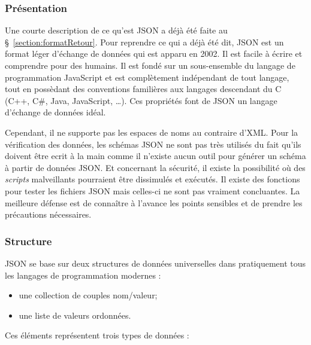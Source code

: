 \subsubsection{Pr\'esentation}

Une courte description de ce qu'est JSON a d\'ej\`a \'et\'e faite au \S~\ref{section:formatRetour}.
Pour reprendre ce qui a d\'ej\`a \'et\'e dit, JSON est un format l\'eger d'\'echange de donn\'ees qui est apparu en 2002.
Il est facile \`a \'ecrire et comprendre pour des humains.
Il est fond\'e sur un sous-ensemble du langage de programmation JavaScript et est compl\`etement ind\'ependant de tout langage, tout en poss\`edant des conventions famili\`eres aux langages descendant du C (C++, C\#, Java, JavaScript, \ldots).
Ces propri\'et\'es font de JSON un langage d'\'echange de donn\'ees id\'eal.

Cependant, il ne supporte pas les espaces de noms au contraire d'XML.
Pour la v\'erification des donn\'ees, les sch\'emas JSON ne sont pas tr\`es utilis\'es du fait qu'ils doivent \^etre ecrit \`a la main comme il n'existe aucun outil pour g\'en\'erer un sch\'ema \`a partir de donn\'ees JSON.
Et concernant la s\'ecurit\'e, il existe la possibilit\'e o\`u des \textit{scripts} malveillants pourraient \^etre dissimul\'es et ex\'ecut\'es.
Il existe des fonctions pour tester les fichiers JSON mais celles-ci ne sont pas vraiment concluantes.
La meilleure d\'efense est de conna\^itre \`a l'avance les points sensibles et de prendre les pr\'ecautions n\'ecessaires.

\subsubsection{Structure}

JSON se base sur deux structures de donn\'ees universelles dans pratiquement tous les langages de programmation modernes :

\begin{itemize}
	\item une collection de couples nom/valeur;
	\item une liste de valeurs ordonn\'ees.

\end{itemize}

\vspace{0.20cm}

\noindent Ces \'el\'ements repr\'esentent trois types de donn\'ees :

